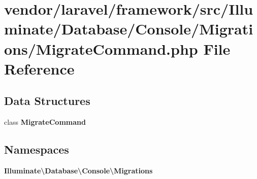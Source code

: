 \section{vendor/laravel/framework/src/\+Illuminate/\+Database/\+Console/\+Migrations/\+Migrate\+Command.php File Reference}
\label{_migrate_command_8php}
\subsection*{Data Structures}
\begin{DoxyCompactItemize}
\item 
class {\bf Migrate\+Command}
\end{DoxyCompactItemize}
\subsection*{Namespaces}
\begin{DoxyCompactItemize}
\item 
 {\bf Illuminate\textbackslash{}\+Database\textbackslash{}\+Console\textbackslash{}\+Migrations}
\end{DoxyCompactItemize}
